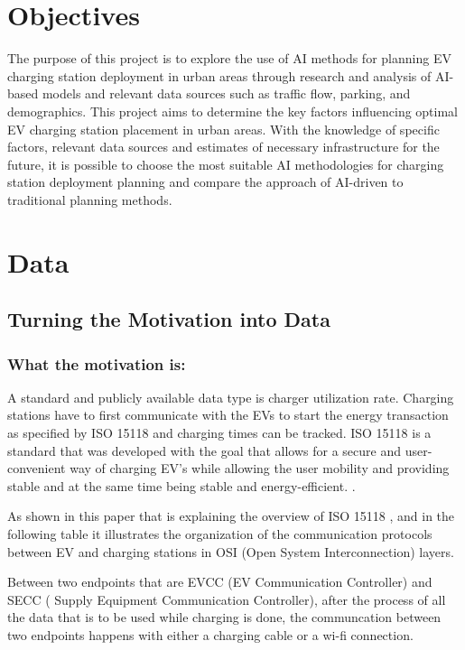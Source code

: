 \section{Objectives}
The purpose of this project is to explore the use of AI methods for planning EV charging station deployment in urban areas through research and analysis of AI-based models and relevant data sources such as traffic flow, parking, and demographics. This project aims to determine the key factors influencing optimal EV charging station placement in urban areas. With the knowledge of specific factors, relevant data sources and estimates of necessary infrastructure for the future, it is possible to choose the most suitable AI methodologies for charging station deployment planning and compare the approach of AI-driven to traditional planning methods.

\section{Data}
\subsection{Turning the Motivation into Data}\label{sec:41}
\subsubsection{What the motivation is:}\label{sec:42}

A standard and publicly available data type is charger utilization rate. Charging stations have to first communicate with the EVs to start the energy transaction as specified by ISO 15118\cite{ISO15118} and charging times can be tracked. ISO 15118\cite{ISO15118} is a standard that was developed with the goal that allows for a secure and user-convenient way of charging EV’s while allowing the user mobility and providing stable and at the same time being stable and energy-efficient. \cite{Mueltin2018}.

As shown in this paper that is explaining the overview of ISO 15118 \cite{ISO15118} \cite{Mueltin2018}, and in the following table it illustrates the organization of the communication protocols between EV and charging stations in OSI (Open System Interconnection) layers.

Between two endpoints that are EVCC (EV Communication Controller) and SECC ( Supply Equipment Communication Controller), after the process of all the data that is to be used while charging is done, the communcation between two endpoints happens with either a charging cable or a wi-fi connection. 

